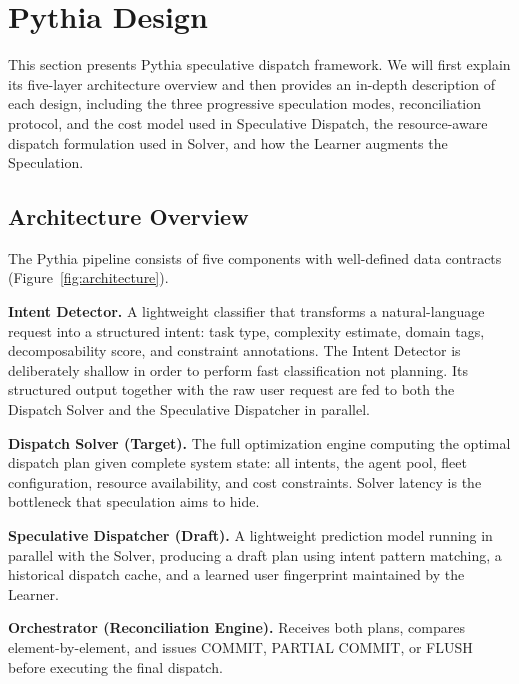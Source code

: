 \documentclass[conference,10pt]{IEEEtran}
\begin{document}

\section{Pythia Design}
\label{sec:design}

This section presents Pythia speculative dispatch framework. We will first explain its five-layer architecture overview and then provides an in-depth description of each design, including the three progressive speculation modes, reconciliation protocol, and the cost model used in Speculative Dispatch, the resource-aware dispatch formulation used in Solver, and how the Learner augments the Speculation.

\subsection{Architecture Overview}

The Pythia pipeline consists of five components with well-defined data contracts (Figure~\ref{fig:architecture}).

\textbf{Intent Detector.}
A lightweight classifier that transforms a natural-language request into a structured intent: task type, complexity estimate, domain tags, decomposability score, and constraint annotations.
The Intent Detector is deliberately shallow in order to perform fast classification not planning.
Its structured output together with the raw user request are fed to both the Dispatch Solver and the Speculative Dispatcher in parallel.

\textbf{Dispatch Solver (Target).}
The full optimization engine computing the optimal dispatch plan given complete system state: all intents, the agent pool, fleet configuration, resource availability, and cost constraints.
Solver latency is the bottleneck that speculation aims to hide.

\textbf{Speculative Dispatcher (Draft).}
A lightweight prediction model running in parallel with the Solver, producing a draft plan using intent pattern matching, a historical dispatch cache, and a learned user fingerprint maintained by the Learner.

\textbf{Orchestrator (Reconciliation Engine).}
Receives both plans, compares element-by-element, and issues COMMIT, PARTIAL COMMIT, or FLUSH before executing the final dispatch.
\end{document}
